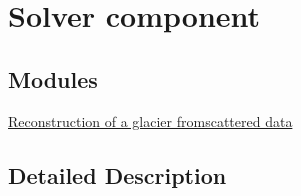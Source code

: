 \hypertarget{group__examples__solver}{\section{Solver component}
\label{group__examples__solver}
}
\subsection*{Modules}
\begin{DoxyCompactItemize}
\item 
\hyperlink{group__examples__solver__glacier}{Reconstruction of a glacier fromscattered data}
\end{DoxyCompactItemize}


\subsection{Detailed Description}
